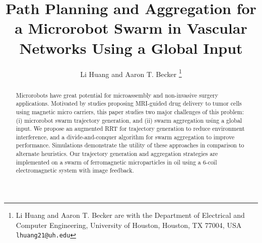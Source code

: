 \documentclass[letterpaper, 10 pt, conference]{ieeeconf}  %
\title{\LARGE \bf 
Path Planning and Aggregation for a Microrobot Swarm in Vascular Networks Using a Global Input 
}
\author{Li Huang and Aaron T. Becker%
\thanks{Li Huang and Aaron T. Becker are with the Department of Electrical and Computer Engineering, University of Houston, Houston, TX 77004, USA
        {\tt\small lhuang21@uh.edu}}%
}
\begin{document}
\maketitle
\thispagestyle{empty}
\pagestyle{empty}

\begin{abstract}
Microrobots have great potential for microassembly and non-invasive surgery applications. %
Motivated by studies proposing MRI-guided drug delivery to tumor cells using magnetic micro carriers, this paper studies two major challenges of this problem: (i) microrobot swarm trajectory generation, and (ii) swarm aggregation using a global input. 
We propose an augmented RRT for trajectory generation to reduce environment interference, and a divide-and-conquer algorithm for swarm aggregation to improve performance.
Simulations demonstrate the utility of these approaches in comparison to alternate heuristics. Our trajectory generation and aggregation strategies are implemented on a swarm of ferromagnetic microparticles in oil using a 6-coil electromagnetic system with image feedback. 
\end{abstract}

%	
\end{document}
